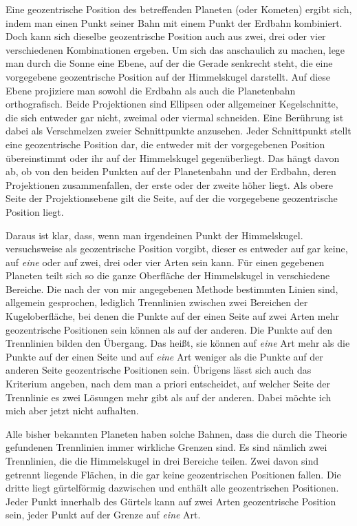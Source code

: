 Eine geozentrische Position des betreffenden Planeten (oder Kometen) ergibt sich, indem man einen Punkt seiner Bahn mit einem Punkt der Erdbahn kombiniert. Doch kann sich dieselbe geozentrische Position auch aus zwei, drei oder vier verschiedenen Kombinationen ergeben. Um sich das anschaulich zu machen, lege man durch die Sonne eine Ebene, auf der die Gerade senkrecht steht, die eine vorgegebene geozentrische Position auf der Himmelskugel darstellt. Auf diese Ebene projiziere man sowohl die Erdbahn als auch die Planetenbahn orthografisch. Beide Projektionen sind Ellipsen oder allgemeiner Kegelschnitte, die sich entweder gar nicht, zweimal oder viermal schneiden. Eine Berührung ist dabei als Verschmelzen zweier Schnittpunkte anzusehen. Jeder Schnittpunkt stellt eine geozentrische Position dar, die entweder mit der vorgegebenen Position übereinstimmt oder ihr auf der Himmelskugel gegenüberliegt. Das hängt davon ab, ob von den beiden Punkten auf der Planetenbahn und der Erdbahn, deren Projektionen zusammenfallen, der erste oder der zweite höher liegt. Als obere Seite der Projektionsebene gilt die Seite, auf der die vorgegebene geozentrische Position liegt.

Daraus ist klar, dass, wenn man irgendeinen Punkt der Himmelskugel. versuchsweise als geozentrische Position vorgibt, dieser es entweder auf gar keine, auf \textit{eine} oder auf zwei, drei oder vier Arten sein kann. Für einen gegebenen Planeten teilt sich so die ganze Oberfläche der Himmelskugel in verschiedene Bereiche. Die nach der von mir angegebenen Methode bestimmten Linien sind, allgemein gesprochen, lediglich Trennlinien zwischen zwei Bereichen der Kugeloberfläche, bei denen die Punkte auf der einen Seite auf zwei Arten mehr geozentrische Positionen sein können als auf der anderen. Die Punkte auf den Trennlinien bilden den Übergang. Das heißt, sie können auf \textit{eine} Art mehr als die Punkte auf der einen Seite und auf \textit{eine} Art weniger als die
%
Punkte auf der anderen Seite geozentrische Positionen sein. Übrigens lässt sich auch das Kriterium angeben, nach dem man a priori entscheidet, auf welcher Seite der Trennlinie es zwei Lösungen mehr gibt als auf der anderen. Dabei möchte ich mich aber jetzt nicht aufhalten.

Alle bisher bekannten Planeten haben solche Bahnen, dass die durch die Theorie gefundenen Trennlinien immer wirkliche Grenzen sind. Es sind nämlich zwei Trennlinien, die die Himmelskugel in drei Bereiche teilen. Zwei davon sind getrennt liegende Flächen, in die gar keine geozentrischen Positionen fallen. Die dritte liegt gürtelförmig dazwischen und enthält alle geozentrischen Positionen. Jeder Punkt innerhalb des Gürtels kann auf zwei Arten geozentrische Position sein, jeder Punkt auf der Grenze auf \textit{eine} Art.

